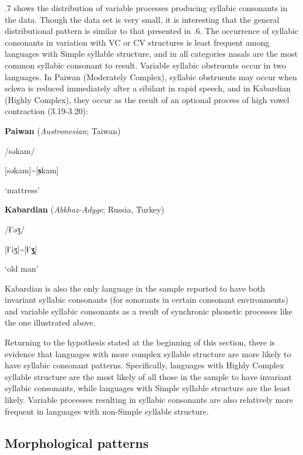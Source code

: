   .7 shows the distribution of variable processes producing syllabic consonants in the data. Though the data set is very small, it is interesting that the general distributional pattern is similar to that presented in .6. The occurrence of syllabic consonants in variation with VC or CV structures is least frequent among languages with Simple syllable structure, and in all categories nasals are the most common syllabic consonant to result. Variable syllabic obstruents occur in two languages. In Paiwan (Moderately Complex), syllabic obstruents may occur when schwa is reduced immediately after a sibilant in rapid speech, and in Kabardian (Highly Complex), they occur as the result of an optional process of high vowel contraction (3.19-3.20):

\ea\label{ex:(3.19)}
  \textbf{Paiwan} (\textit{Austronesian}; Taiwan)

/səkam/

[səkam]{\textasciitilde}[\textbf{s̩}kam]

\glt ‘mattress’

\citep[41]{Chang2006}

\z

\ea\label{ex:(3.20)}
  \textbf{Kabardian} (\textit{Abkhaz-Adyge}; Russia, Turkey)

/ɬ{}'əʒ/

[ɬ’iʒ]{\textasciitilde}[ɬ{}'\textbf{ʒ̩}]

\glt ‘old man’

\citep[24]{Kuipers1960}

\z

Kabardian is also the only language in the sample reported to have both invariant syllabic consonants (for sonorants in certain consonant environments) and variable syllabic consonants as a result of synchronic phonetic processes like the one illustrated above.

  Returning to the hypothesis stated at the beginning of this section, there is evidence that languages with more complex syllable structure are more likely to have syllabic consonant patterns. Specifically, languages with Highly Complex syllable structure are the most likely of all those in the sample to have invariant syllabic consonants, while languages with Simple syllable structure are the least likely. Variable processes resulting in syllabic consonants are also relatively more frequent in languages with non-Simple syllable structure.

\subsection{Morphological patterns}\label{sec:3.3.6}

